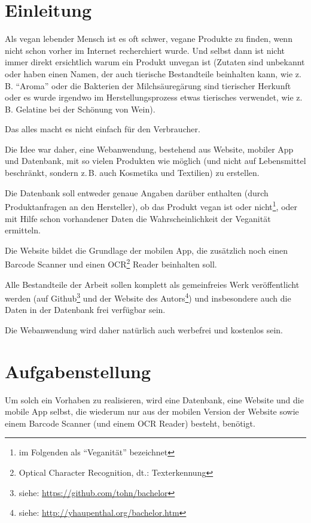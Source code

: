 \documentclass[a4paper]{report}
\begin{document}
\chapter{Einleitung}
\label{chap:introduction}

Als vegan lebender Mensch ist es oft schwer, vegane
Produkte zu finden, wenn nicht schon vorher im Internet recherchiert
wurde. Und selbst dann ist nicht immer direkt ersichtlich warum ein
Produkt unvegan ist (Zutaten sind unbekannt oder haben einen Namen,
der auch tierische Bestandteile beinhalten kann, wie z.\,B. ``Aroma''
oder die
Bakterien der Milchsäuregärung sind tierischer Herkunft oder es
wurde irgendwo im Herstellungsprozess etwas tierisches verwendet, wie
z.\,B. Gelatine bei der Schönung von Wein).

Das alles macht es nicht einfach für den Verbraucher.

Die Idee war daher, eine Webanwendung, bestehend aus Website, mobiler
App und Datenbank, mit
so vielen Produkten wie möglich (und nicht auf Lebensmittel
beschränkt, sondern z.\,B. auch Kosmetika und Textilien) zu erstellen.

Die Datenbank soll entweder genaue Angaben darüber enthalten (durch
Produktanfragen an
den Hersteller), ob das Produkt vegan ist oder nicht\footnote{im
Folgenden als ``Veganität'' bezeichnet}, oder mit Hilfe
schon vorhandener Daten die Wahrscheinlichkeit der Veganität
ermitteln.

Die Website bildet die Grundlage der mobilen App, die zusätzlich noch
einen Barcode Scanner und einen OCR\footnote{Optical Character
Recognition, dt.: Texterkennung}
Reader beinhalten soll.

Alle Bestandteile der Arbeit sollen komplett
als gemeinfreies Werk veröffentlicht werden (auf
Github\footnote{siehe: \url{https://github.com/tohn/bachelor}} und der
Website des
Autors\footnote{siehe: \url{http://yhaupenthal.org/bachelor.htm}}) und
insbesondere auch die
Daten in der Datenbank frei verfügbar sein.

Die Webanwendung wird daher natürlich auch werbefrei und kostenlos
sein.

\chapter{Aufgabenstellung}
\label{chap:aufgabenstellung}

Um solch ein Vorhaben zu realisieren, wird eine Datenbank, eine
Website und die mobile App selbst, die wiederum nur aus der mobilen Version
der Website sowie einem Barcode Scanner (und einem OCR Reader)
besteht, benötigt.
\end{document}
